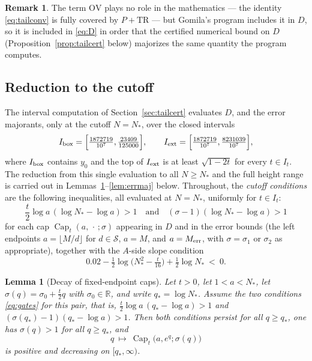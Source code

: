 \documentclass[11pt]{article}
\newtheorem{lemma}[theorem]{Lemma}
\theoremstyle{definition}
\newtheorem{remark}[theorem]{Remark}
\newcommand{\R}{\mathbb{R}}
\newcommand{\calS}{\mathcal{S}}
\newcommand{\CapT}{\operatorname{Cap}}
\begin{document}
\begin{remark}
The term $\mathrm{OV}$ plays no role in the mathematics --- the
identity \eqref{eq:tailconv} is fully covered by $P+\mathrm{TR}$ ---
but Gomila's program includes it in $D$, so it is included in
\eqref{eq:D} in order that the certified numerical bound on $D$
(Proposition~\ref{prop:tailcert} below) majorizes the same quantity
the program computes.
\end{remark}

\subsection{Reduction to the cutoff}\label{sec:tailmono}

The interval computation of Section~\ref{sec:tailcert} evaluates
$D$, and the error majorants, only at the cutoff $N=N_*$, over the
closed intervals
\[
I_{\rm box}=\Bigl[\tfrac{1872719}{10^7},\tfrac{23409}{125000}\Bigr],
\qquad
I_{\rm ext}=\Bigl[\tfrac{1872719}{10^7},\tfrac{8231039}{10^7}\Bigr],
\]
where $I_{\rm box}$ contains $y_0$ and the top of $I_{\rm ext}$ is
at least $\sqrt{1-2t}$ for every $t\in I_t$. The reduction from
this single evaluation to all $N\ge N_*$ and the full height range
is carried out in Lemmas~\ref{lem:capdecay}--\ref{lem:errmaj}
below. Throughout, the \emph{cutoff conditions} are the following
inequalities, all evaluated at $N=N_*$, uniformly for $t\in I_t$:
\begin{equation}\label{eq:gates}
\frac t2\log a\,(\log N_*-\log a)>1
\quad\text{and}\quad
(\sigma-1)(\log N_*-\log a)>1
\end{equation}
for each cap $\CapT_t(a,\,\cdot\,;\sigma)$ appearing in $D$ and in
the error bounds (the left endpoints $a=\lfloor M/d\rfloor$ for
$d\in\calS$, $a=M$, and $a=M_{\rm err}$, with $\sigma=\sigma_1$ or
$\sigma_2$ as appropriate), together with the $A$-side slope
condition
\begin{equation}\label{eq:ym}
0.02-\tfrac12\log\bigl(N_*^2-\tfrac t{16}\bigr)+\tfrac12\log N_*\ <\ 0 .
\end{equation}

\begin{lemma}[Decay of fixed-endpoint caps]\label{lem:capdecay}
Let $t>0$, let $1<a<N_*$, let $\sigma(q)=\sigma_0+\frac t2q$ with
$\sigma_0\in\R$, and write $q_*=\log N_*$. Assume the two
conditions \eqref{eq:gates} for this pair, that is,
$\frac t2\log a\,(q_*-\log a)>1$ and
$(\sigma(q_*)-1)(q_*-\log a)>1$. Then both conditions persist for
all $q\ge q_*$, one has $\sigma(q)>1$ for all $q\ge q_*$, and
\[
q\ \longmapsto\ \CapT_t\bigl(a,e^q;\sigma(q)\bigr)
\]
is positive and decreasing on $[q_*,\infty)$.
\end{lemma}
\end{document}
